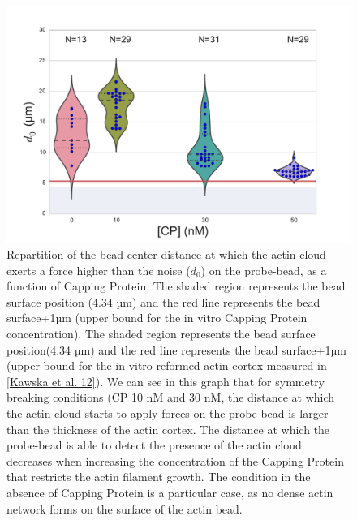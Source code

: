 \documentclass[A4paperpaper,11pt,english]{sphinxmanual}
\begin{document}
\begin{figure}[htbp]
\centering
\capstart

\includegraphics[width=0.650\linewidth]{d0_violin.pdf}
\caption{Repartition of the bead-center distance at which the actin cloud exerts a
force higher than the noise (\(d_0\)) on the probe-bead, as a function of
Capping Protein. The shaded region represents the bead surface position     (4.34 µm) and the red line represents the bead surface+1µm (upper bound for
the in vitro
Capping Protein concentration). The shaded region represents the bead surface position(4.34 µm) and the red line represents the bead surface+1µm
(upper bound for the in vitro
reformed actin cortex measured in {\hyperref[parts/part3:kawska2012]{{[}Kawska et al. 12{]}}}). We can see in this graph that for symmetry breaking
conditions (CP 10 nM and 30 nM, the distance at which the actin cloud starts to apply
forces on the probe-bead is larger than the thickness of the actin
cortex. The distance at which the probe-bead is able to detect the presence
of the actin cloud decreases when increasing the concentration of the Capping
Protein that restricts  the actin filament growth. The condition in the absence
of Capping Protein is a particular case, as no dense actin network forms
on the surface of the actin bead.}\label{parts/part3:d0-violin}\end{figure}
\end{document}
